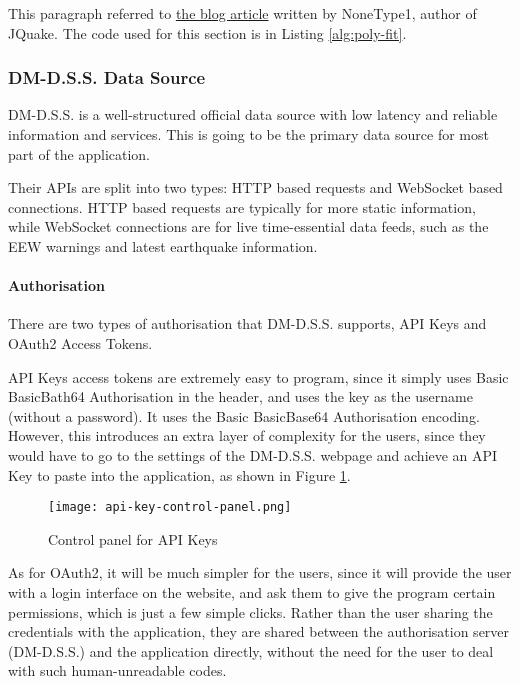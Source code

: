 This paragraph referred to \href{https://qiita.com/NoneType1/items/a4d2cf932e20b56ca444}{the blog article} written by NoneType1, author of JQuake. The code used for this section is in Listing \ref{alg:poly-fit}.

\subsubsection{DM-D.S.S. Data Source}

DM-D.S.S. is a well-structured official data source with low latency and reliable information and services. This is going to be the primary data source for most part of the application.

Their APIs are split into two types: HTTP based requests and WebSocket based connections. HTTP based requests are typically for more static information, while WebSocket connections are for live time-essential data feeds, such as the EEW warnings and latest earthquake information.

\paragraph{Authorisation} There are two types of authorisation that DM-D.S.S. supports, API Keys and OAuth2 Access Tokens.

API Keys access tokens are extremely easy to program, since it simply uses Basic BasicBath64 Authorisation in the header, and uses the key as the username (without a password). It uses the Basic BasicBase64 Authorisation encoding. However, this introduces an extra layer of complexity for the users, since they would have to go to the settings of the DM-D.S.S. webpage and achieve an API Key to paste into the application, as shown in Figure \ref{fig:api-key-control-panel}.

\begin{figure}[!ht]
    \centering
    \texttt{[image: api-key-control-panel.png]}
    \caption{Control panel for API Keys}
    \label{fig:api-key-control-panel}
\end{figure}

As for OAuth2, it will be much simpler for the users, since it will provide the user with a login interface on the website, and ask them to give the program certain permissions, which is just a few simple clicks. Rather than the user sharing the credentials with the application, they are shared between the authorisation server (DM-D.S.S.) and the application directly, without the need for the user to deal with such human-unreadable codes.

